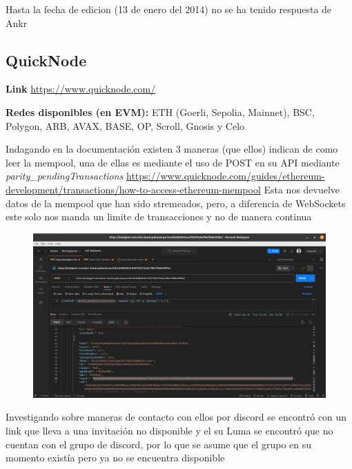 Hasta la fecha de edicion (13 de enero del 2014) no se ha tenido respuesta de Ankr

\clearpage
\subsection{QuickNode}

\textbf{Link} \url{https://www.quicknode.com/}

\textbf{Redes disponibles (en EVM):} ETH (Goerli, Sepolia, Mainnet), BSC, Polygon, ARB, AVAX, BASE, OP, Scroll, Gnosis y Celo

\medskip

Indagando en la documentación existen 3 maneras (que ellos) indican de como leer la mempool, una de ellas es mediante el uso de POST en su API mediante \textit{parity\_pendingTransactions} 
\url{https://www.quicknode.com/guides/ethereum-development/transactions/how-to-access-ethereum-mempool}
Esta nos devuelve datos de la mempool que han sido stremeados, pero, a diferencia de WebSockets este solo nos manda un limite de transacciones y no de manera continua 

\begin{figure}
    \centering
    \includegraphics[width=1\linewidth]{img//screenshots/Screenshot from 2023-12-18 00-01-52.png}
\end{figure}

Investigando sobre maneras de contacto con ellos por discord se encontró con un link que lleva a una invitación no disponible y el su Luma se encontró que no cuentan con el grupo de discord, por lo que se asume que el grupo en su momento existía pero ya no se encuentra disponible

